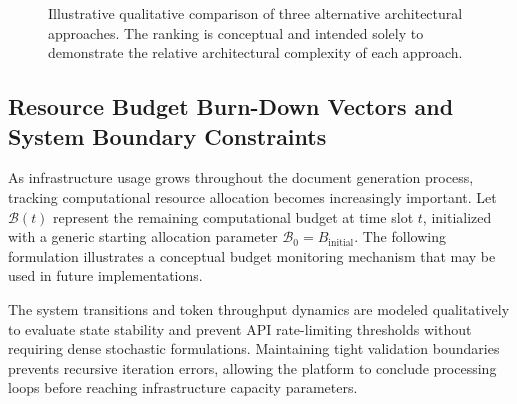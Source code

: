 \begin{figure}[htbp]
\centering
{}

\caption{Illustrative qualitative comparison of three alternative architectural approaches. The ranking is conceptual and intended solely to demonstrate the relative architectural complexity of each approach.}

\label{fig:architecture_comparison}
\end{figure}

\subsection{Resource Budget Burn-Down Vectors and System Boundary Constraints}
As infrastructure usage grows throughout the document generation process, tracking computational resource allocation becomes increasingly important. Let \(\mathcal{B}(t)\) represent the remaining computational budget at time slot \(t\), initialized with a generic starting allocation parameter \(\mathcal{B}_0 = B_{\text{initial}}\). The following formulation illustrates a conceptual budget monitoring mechanism that may be used in future implementations.

The system transitions and token throughput dynamics are modeled qualitatively to evaluate state stability and prevent API rate-limiting thresholds without requiring dense stochastic formulations. Maintaining tight validation boundaries prevents recursive iteration errors, allowing the platform to conclude processing loops before reaching infrastructure capacity parameters.

